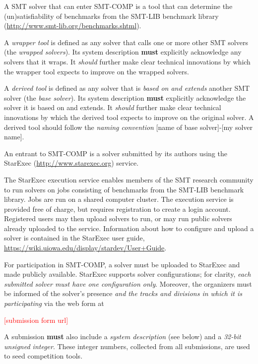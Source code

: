 \documentclass[12pt]{article}
\newcommand{\rem}[1]{\textcolor{red}{[#1]}}
\begin{document}
%
A SMT solver that can enter SMT-COMP is a tool that can
determine the (un)satisfiability of benchmarks from the SMT-LIB benchmark library
(\url{http://www.smt-lib.org/benchmarks.shtml}).

%
A \emph{wrapper tool} is defined as any solver that calls one or more other SMT
solvers (the \emph{wrapped solvers}). Its system description \textbf{must} explicitly acknowledge any
solvers that it wraps.  It \emph{should} further make clear technical
innovations by which the wrapper tool expects to improve on the wrapped
solvers.

%
A \emph{derived tool} is defined as any solver that is \emph{based on and
extends} another SMT solver (the \emph{base solver}).  Its system description
\textbf{must} explicitly acknowledge
the solver it is based on and extends.  It \emph{should} further make clear
technical innovations by which the derived tool expects to improve on the
original solver.  A derived tool should follow the \emph{naming convention}
{[name of base solver]-[my solver name]}.

%
An entrant to SMT-COMP is a solver submitted by its authors using
the StarExec (\url{http://www.starexec.org}) service.

%
The StarExec execution
service enables members of the SMT research community to run solvers
on jobs consisting of benchmarks from the SMT-LIB benchmark library.
Jobs are run on a shared computer cluster.  The execution service is
provided free of charge, but requires registration to create a
login account.  Registered users may then upload solvers to
run, or may run public solvers already uploaded to the service.
Information about how to configure and upload a solver is contained in
the StarExec user guide,
\url{https://wiki.uiowa.edu/display/stardev/User+Guide}.

%
For participation in SMT-COMP, a solver must be uploaded to StarExec
and made publicly available.  StarExec supports solver configurations;
for clarity, \emph{each submitted solver must have one configuration
  only}.  Moreover, the organizers must be informed of the solver's
presence \emph{and the tracks and divisions in which it is
  participating} via the web form at
\begin{center}
  \rem{submission form url}
\end{center}
A submission \textbf{must} also include a \emph{system description} (see below)
and a \emph{32-bit unsigned integer}.
 These integer numbers, collected from all submissions, are used to seed
 competition tools.
\end{document}
